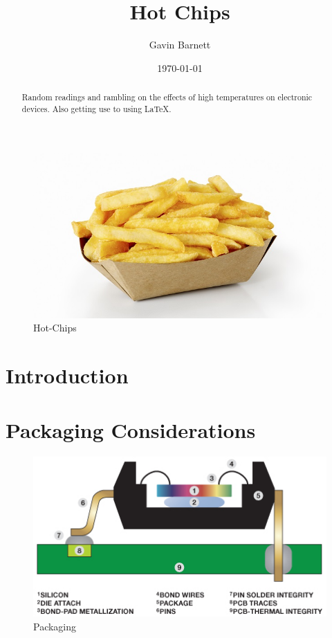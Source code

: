 \documentclass{article}
\title{Hot Chips}
\author{Gavin Barnett}
\date{\today}
\begin{document}
\maketitle
	\begin{figure}[h]
		\centering
		\includegraphics[scale=2.3]{Hot-chips-Getty}
		\caption{Hot-Chips}
	\end{figure}
\begin{abstract}
Random readings and rambling on the effects of high temperatures on electronic devices. 
Also getting use to using LaTeX.

\end{abstract}
\maketitle

\newpage

\tableofcontents

\newpage

\section{Introduction}

\newpage


\section{Packaging Considerations}
	\begin{figure}[h]
		\centering
		\includegraphics[scale=1]{Package_Breakdown}
		\caption{Packaging}
		\label{fig:packaging}
	\end{figure}
	
\end{document}
